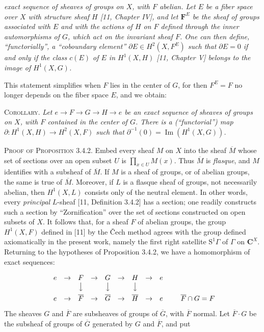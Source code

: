 
\noindent\textit{exact sequence of sheaves of groups on $X$, with $F$ abelian. Let
$E$ be a fiber space over $X$ with structure sheaf $H$ \textup{[11,} Chapter IV\textup{]}, and
let $\mathbf F^E$ be the sheaf of groups associated with $E$ and with the actions of
$H$ on $F$ defined through the inner automorphisms of $G$, which act on the
invariant sheaf $F$. One can then define, ``functorially'', a ``coboundary
element'' $\partial E\in H^2(X,F^E)$ such that $\partial E=0$ if and only if
the class $c(E)$ of $E$ in $H^1(X,H)$ \textup{[11,} Chapter V\textup{]} belongs to the image of
$H^1(X,G)$.}

This statement simplifies when $F$ lies in the center of $G$, for then
$F^E=F$ no longer depends on the fiber space $E$, and we obtain:

\indent\textsc{Corollary.} \textit{Let
$e\to F\to G\to H\to e$
be an exact sequence of sheaves of groups on $X$, with $F$ contained in the
center of $G$. There is a \textup{(}``functorial''\textup{)} map
$\partial:H^1(X,H)\to H^2(X,F)$
such that $\partial^{-1}(0)=\operatorname{Im}(H^1(X,G))$.}

\indent\textsc{Proof of Proposition 3.4.2.} Embed every sheaf $M$ on $X$ into the
sheaf $\overline M$ whose set of sections over an open subset $U$ is
$\displaystyle\prod_{x\in U}M(x)$.
Thus $\overline M$ is \textit{flasque}, and $M$ identifies with a subsheaf of
$\overline M$. If $M$ is a sheaf of groups, or of abelian groups, the same is
true of $\overline M$. Moreover, if $L$ is a flasque sheaf of groups, not
necessarily abelian, then $H^1(X,L)$ consists only of the neutral element. In
other words, every \textit{principal} $L$-sheaf [11, Definition 3.4.2] has a section;
one readily constructs such a section by ``Zornification'' over the set of
sections constructed on open subsets of $X$.
It follows that, for a sheaf $F$ of abelian groups, the group $H^1(X,F)$
defined in [11] by the Čech method agrees with the group defined axiomatically
in the present work, namely the first right satellite $\mathrm S^1\Gamma$ of
$\Gamma$ on $\mathbf C^X$. Returning to the hypotheses of Proposition 3.4.2, we have
a homomorphism of exact sequences:

\[
\begin{array}[b]{ccccccccc}
e&\to&F&\to&G&\to&H&\to&e\\
&&\big\downarrow&&\big\downarrow&&\big\downarrow&&\\[0.45em]
e&\to&\overline F&\to&\overline G&\to
&\overline H&\to&e
\end{array}
\qquad \overline F\cap G=F
\]
The sheaves $G$ and $\overline F$ are subsheaves of groups of $\overline G$,
with $\overline F$ normal. Let $\overline F\mathbin{\cdot}G$ be the subsheaf
of groups of $\overline G$ generated by $G$ and $\overline F$, and put

